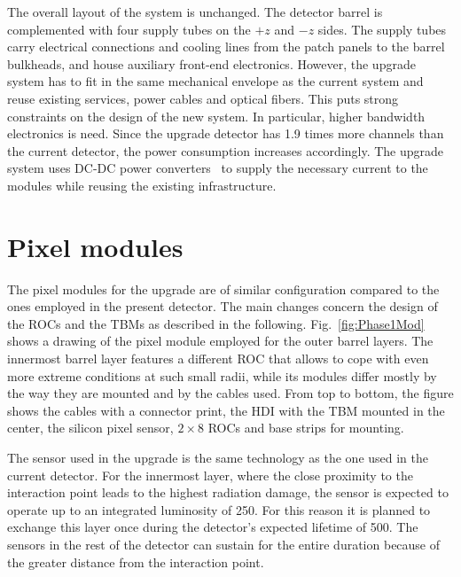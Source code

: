 The overall layout of the system is unchanged. The detector barrel is complemented with four supply tubes on the $+z$ and $-z$ sides. The supply tubes carry electrical connections and cooling lines from the patch panels to the barrel bulkheads, and house auxiliary front-end electronics. However, the upgrade system has to fit in the same mechanical envelope as the current system and reuse existing services, power cables and optical fibers. This puts strong constraints on the design of the new system. In particular, higher bandwidth electronics is need. Since the upgrade detector has 1.9 times more channels than the current detector, the power consumption increases accordingly. The upgrade system uses DC-DC power converters~\cite{1748-0221-10-01-C01052} to supply the necessary current to the modules while reusing the existing infrastructure.

\section{Pixel modules}

The pixel modules for the upgrade are of similar configuration compared to the ones employed in the present detector. The main changes concern the design of the ROCs and the TBMs as described in the following.
Fig.~\ref{fig:Phase1Mod} shows a drawing of the pixel module employed for the outer barrel layers.
The innermost barrel layer features a different ROC that allows to cope with even more extreme conditions at such small radii, while its modules differ mostly by the way they are mounted and by the cables used.
From top to bottom, the figure shows the cables with a connector print, the HDI with the TBM mounted in the center, the silicon pixel sensor, $2\times8$ ROCs and base strips for mounting.

The sensor used in the upgrade is the same technology as the one used in the current detector. For the innermost layer, where the close proximity to the interaction point leads to the highest radiation damage, the sensor is expected to operate up to an integrated luminosity of 250\fbinv. For this reason it is planned to exchange this layer once during the detector's expected lifetime of 500\fbinv. The sensors in the rest of the detector can sustain for the entire duration because of the greater distance from the interaction point.

